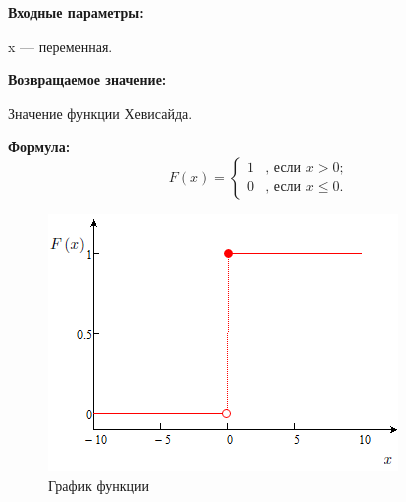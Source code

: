 \textbf{Входные параметры:}

 x --- переменная.

\textbf{Возвращаемое значение:}
 
 Значение функции Хевисайда.
 
\textbf{Формула:}
\begin{equation*}
F\left(x \right)=\left\lbrace \begin{aligned}
1&\text{, если } x>0; \\
0&\text{, если } x\leq 0.
\end{aligned}\right. 
\end{equation*}

 \begin{figure} [h] 
   \center
   \includegraphics {HML_HeavisideFunction_Graph.png}
   \caption{График функции} 
   \label{img:HML_HeavisideFunction_Graph}  
 \end{figure}
 
